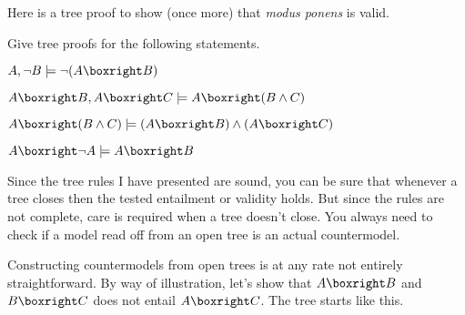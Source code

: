
Here is a tree proof to show (once more) that \emph{modus ponens} is valid.

\begin{center}
\end{center}

\begin{exercise}
  Give tree proofs for the following statements.
  \begin{exlist}
  \item $A, \neg B \models \neg(A\boxright B)$ 
  \item $A\boxright B, A\boxright C \models  A \boxright (B \land C)$ %
  \item $A \boxright (B \land C) \models (A \boxright B) \land (A\boxright C)$
  \item $A\boxright \neg A \models A\boxright B$ 
  \end{exlist}
\end{exercise}

Since the tree rules I have presented are sound, you can be sure that whenever a
tree closes then the tested entailment or validity holds.  But since the rules
are not complete, care is required when a tree doesn't close. You always need to
check if a model read off from an open tree is an actual countermodel.

Constructing countermodels from open trees is at any rate not entirely
straightforward. By way of illustration, let's show that
$A\boxright B$ and $B\boxright C$ does not entail $A \boxright C$. The
tree starts like this.

